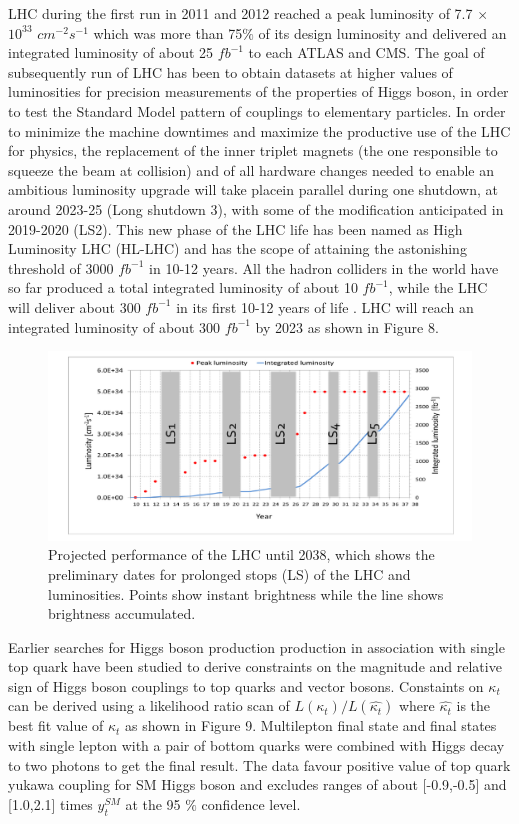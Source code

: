 \documentclass[final,3p]{CSP}
\begin{document}
 LHC during the first run in 2011 and 2012 reached a peak luminosity of 7.7 $\times$ $10^{33}$ $cm^{-2}s^{-1}$ which was more than 75$\%$ of its design luminosity and delivered an integrated luminosity of about 25 $fb^{-1}$ to each ATLAS and CMS. The goal of subsequently run of LHC has been to obtain datasets at higher values of luminosities for precision measurements of the properties of Higgs boson, in order to test the Standard Model pattern of couplings to elementary particles. In order to minimize the machine downtimes and maximize the productive use of the LHC for physics, the replacement of the inner triplet magnets (the one responsible to squeeze the beam at collision) and  of  all  hardware  changes  needed  to  enable  an  ambitious  luminosity  upgrade  will  take  placein parallel during one shutdown, at around 2023-25 (Long shutdown 3), with some of the modification anticipated in 2019-2020 (LS2). This new phase of the LHC life has been named as High Luminosity LHC (HL-LHC) and has the scope of attaining the astonishing threshold of 3000 $fb^{-1}$ in 10-12 years. All the hadron colliders in the world have so far produced a total integrated luminosity of about 10 $fb^{-1}$, while the LHC will deliver about 300 $fb^{-1}$ in its first 10-12 years of life \cite{collaborations2019report}. LHC will reach an integrated luminosity of about 300 $fb^{-1}$ by 2023 as shown in Figure 8. \\
 
 \begin{figure}[H]
 	\centering
 	\includegraphics[scale=0.45]{./lum6.png}
 	\caption{\onehalfspacing Projected performance of the LHC until 2038, which shows the preliminary dates for prolonged stops (LS) of the LHC and luminosities. Points show instant brightness while the line shows brightness accumulated.}
 	\label{figure 8}
 \end{figure}


 Earlier searches for Higgs boson production production in association with single top quark have been studied to derive constraints on the magnitude and relative sign of Higgs boson couplings to top quarks and vector bosons. Constaints on $\kappa_t$ can be derived using a likelihood ratio scan of $L(\kappa_t)/L(\hat{\kappa_t})$ where $\hat{\kappa_t}$ is the best fit value of $\kappa_t$ as shown in Figure 9. Multilepton final state and final states with single lepton with a pair of bottom quarks were combined with Higgs decay to two photons to get the final result. The data favour positive value of top quark yukawa coupling for SM Higgs boson and excludes ranges of about [-0.9,-0.5] and [1.0,2.1] times $y^{SM}_t$ at the 95 $\%$ confidence level.
\end{document}
